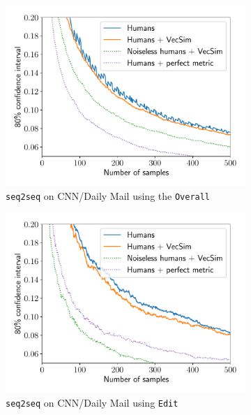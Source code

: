 \begin{figure}[th]
  \centering
  \begin{subfigure}[b]{0.32\textwidth}
  \includegraphics[width=\textwidth]{figures/lqual_trajectory_foil}
    \caption{\label{fig:trajectory-a}\texttt{seq2seq} on CNN/Daily Mail using the \texttt{Overall}}
  \end{subfigure} 
  \hfill
  \begin{subfigure}[b]{0.32\textwidth}
  \includegraphics[width=\textwidth]{figures/lqual_trajectory}
  \caption{\label{fig:trajectory-b}\texttt{seq2seq} on CNN/Daily Mail using \texttt{Edit} }
  \end{subfigure}
  \hfill
  \begin{subfigure}[b]{0.32\textwidth}

\end{subfigure}
\end{figure}
